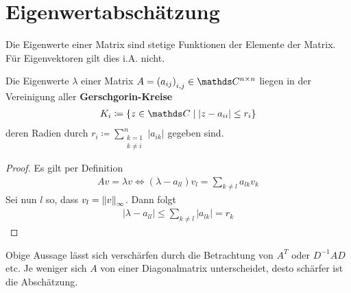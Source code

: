% 
% 
% 
% 


\chapter{Eigenwertabschätzung}

Die Eigenwerte einer Matrix sind stetige Funktionen
der Elemente der Matrix.
Für Eigenvektoren gilt dies i.A. nicht.

\begin{Satze}[Gerschgorin, 1931]
  Die Eigenwerte $\lambda$ einer Matrix
  $A=\left(a_{ij}\right)_{i,j}\in \C^{n\times n}$
  liegen in der Vereinigung aller 
  \textbf{Gerschgorin-Kreise}
  \begin{gather*}
    K_i\coloneqq\left\{ z\in\C \mid |z-a_{ii}| \leq r_i\right\}
  \end{gather*}
  deren Radien durch 
  $r_i\coloneqq \sum_{\substack{k=1\\k\neq i}}^{n}|a_{ik}|$
  gegeben sind.

  \begin{proof}
    Es gilt per Definition
    \begin{gather*}
      Av=\lambda v \Leftrightarrow 
      (\lambda - a_{ll})v_l = \sum_{k\neq l} a_{lk}v_k
    \end{gather*}
    Sei nun $l$ so, dass $v_l=\left\| v \right\|_\infty$. Dann folgt
    \begin{gather*}
      |\lambda - a_{ll} | \leq \sum_{k\neq l} |a_{lk}|=r_k
    \end{gather*}
  \end{proof}
\end{Satze}

  Obige Aussage lässt sich verschärfen durch
  die Betrachtung von $A^T$ oder $D^{-1}AD$ etc.
  Je weniger sich $A$ von einer Diagonalmatrix unterscheidet,
  desto schärfer ist die Abschätzung.

